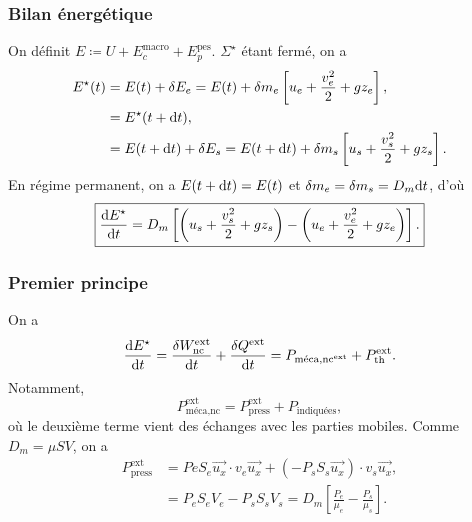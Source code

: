         \subsubsection{Bilan énergétique}

            On définit $E\coloneqq U+E_c^{\text{macro}}+E_p^{\text{pes}}$. $\Sigma^{\star}$ étant fermé, on a 
            \begin{align}
                E^{\star}(t)
                &=E(t)+\delta E_e=E(t)+\delta m_e\left[u_e+\frac{v_e^{2}}{2}+gz_e\right],\\
                &=E^{\star}(t+\mathrm{d} t),\\
                &= E(t+\mathrm{d} t)+\delta E_s=E(t+\mathrm{d} t)+\delta m_s\left[u_s+\frac{v_s^{2}}{2}+g z_s\right].
            \end{align}
            En régime permanent, on a $E(t+\mathrm{d} t)=E(t)$ et $\delta m_e=\delta m_s=D_m\mathrm{d} t$, d'où
            \begin{equation}
                \boxed{
                    \frac{\mathrm{d} E^{\star}}{\mathrm{d} t}=D_m\left[\left(u_s+\frac{v_s^{2}}{2}+g z_s\right)-\left(u_e+\frac{v_e^{2}}{2}+g z_e\right)\right].
                }
            \end{equation}

        \subsubsection{Premier principe}

            On a 
            \begin{equation}
                \frac{\mathrm{d} E^{\star}}{\mathrm{d} t}=\frac{\delta W_{\text{nc}}^{\text{ext}}}{\mathrm{d} t}+\frac{\delta Q^{\text{ext}}}{\mathrm{d} t}=P_{\text{méca,nc}^{\text{ext}}}+P_{\text{th}}^{\text{ext}}.
            \end{equation}
            Notamment, 
            \begin{equation}
                P_{\text{méca,nc}}^{\text{ext}}=P_{\text{press}}^{\text{ext}}+P_{\text{indiquées}},
            \end{equation}
            où le deuxième terme vient des échanges avec les parties mobiles. Comme $D_m=\mu SV$, on a 
            \begin{align}
                P_{\text{press}}^{\text{ext}}
                &=Pe S_e\vec{u_x}\cdot v_e\vec{u_x}+(-P_s S_s\vec{u_x})\cdot v_s\vec{u_x},\\
                &=P_e S_e V_e-P_s S_s V_s = D_m\left[\frac{P_e}{\mu_e}-\frac{P_s}{\mu_s}\right].
            \end{align}

